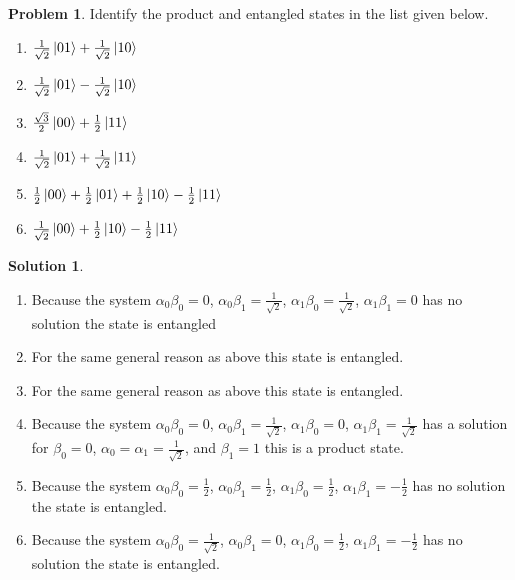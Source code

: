 \documentclass[10pt]{article}
\theoremstyle{definition}
\newtheorem{problem}{Problem}
\newtheorem{soln}{Solution}
\begin{document}
\begin{problem}
Identify the product and entangled states in the list given below.
\begin{enumerate}[label=(\alph*)]
  \item $\frac{1}{\sqrt{2}}\ket{01}+\frac{1}{\sqrt{2}}\ket{10}$
  \item $\frac{1}{\sqrt{2}}\ket{01}-\frac{1}{\sqrt{2}}\ket{10}$
  \item $\frac{\sqrt{3}}{2}\ket{00}+\frac{1}{2}\ket{11}$
  \item $\frac{1}{\sqrt{2}}\ket{01}+\frac{1}{\sqrt{2}}\ket{11}$
  \item $\frac{1}{2}\ket{00}+\frac{1}{2}\ket{01}+\frac{1}{2}\ket{10}-\frac{1}{2}\ket{11}$
  \item $\frac{1}{\sqrt{2}}\ket{00}+\frac{1}{2}\ket{10}-\frac{1}{2}\ket{11}$
\end{enumerate}
\end{problem}
\begin{soln}~
  \begin{enumerate}[label=(\alph*)]
    \item Because the system $\alpha_0\beta_0=0$, $\alpha_0\beta_1=\frac{1}{\sqrt{2}}$,
          $\alpha_1\beta_0=\frac{1}{\sqrt{2}}$, $\alpha_1\beta_1=0$ has no solution the state is entangled
    \item For the same general reason as above this state is entangled.
    \item For the same general reason as above this state is entangled.
    \item Because the system $\alpha_0\beta_0=0$, $\alpha_0\beta_1=\frac{1}{\sqrt{2}}$,
          $\alpha_1\beta_0=0$, $\alpha_1\beta_1=\frac{1}{\sqrt{2}}$ has a solution for $\beta_0=0$,
          $\alpha_0=\alpha_1=\frac{1}{\sqrt{2}}$, and $\beta_1=1$ this is a product state.
    \item Because the system $\alpha_0\beta_0=\frac{1}{2}$, $\alpha_0\beta_1=\frac{1}{2}$,
          $\alpha_1\beta_0=\frac{1}{2}$, $\alpha_1\beta_1=-\frac{1}{2}$ has no solution the state is entangled.
    \item Because the system $\alpha_0\beta_0=\frac{1}{\sqrt{2}}$, $\alpha_0\beta_1=0$,
          $\alpha_1\beta_0=\frac{1}{2}$, $\alpha_1\beta_1=-\frac{1}{2}$ has no solution the state is entangled.
  \end{enumerate}
\end{soln}
\end{document}
